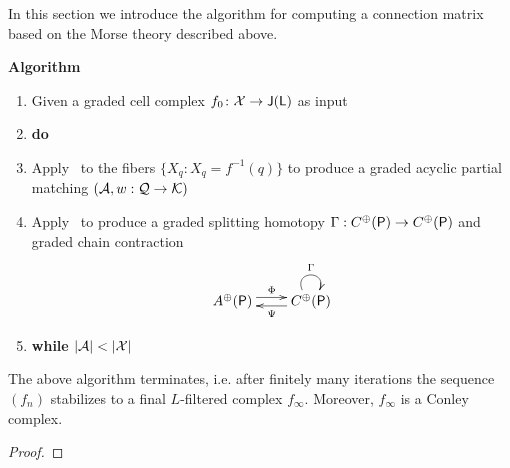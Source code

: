 In this section we introduce the algorithm for computing a connection matrix based on the Morse theory described above.

{\bf Algorithm}
\begin{enumerate}
\item Given a graded cell complex $f_0\colon {\mathcal X}\to {\mathsf J}({\mathsf L})$ as input
\item {\bf do}
\item Apply~\cite[Algorithm 3.6]{focm} to the fibers $\{X_q\colon X_q = f^{-1}(q)\}$ to produce a graded acyclic partial matching $({\mathcal A},w:{\mathcal Q}\to {\mathcal K})$
\item Apply~\cite[Algorithm 3.12]{focm} to produce a graded splitting homotopy $\Gamma:C^\oplus({\mathsf P})\to C^\oplus({\mathsf P})$ and graded chain contraction
\[
\xymatrixrowsep{0.03in}
\xymatrixcolsep{0.3in}
\xymatrix{
A^\oplus(\sP)  \ar[r]<3pt>^{\Phi} & \ar[l]<3pt>^{\Psi} C^\oplus(\sP) \ar@(ul,ur)^{\Gamma}
}
\]
\item {\bf while $|\cA|<|\cX|$}
\end{enumerate}


\begin{thm}
The above algorithm terminates, i.e. after finitely many iterations the sequence $(f_n)$ stabilizes to a final $L$-filtered complex $f_\infty$.  Moreover, $f_\infty$ is a Conley complex.
\end{thm}
\begin{proof}

\end{proof}





